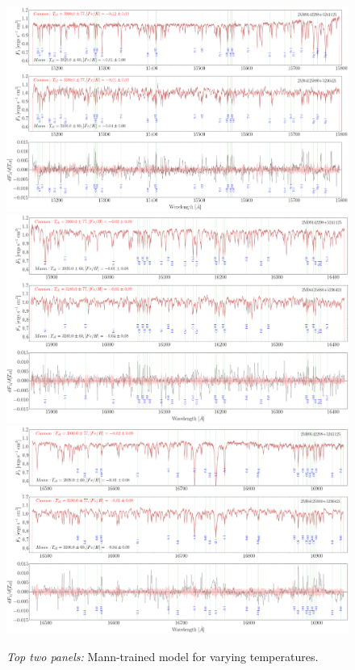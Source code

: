 \documentclass[modern]{aastex62}
\begin{document}
\begin{figure}[ht]
\begin{center}
\includegraphics[width=16cm]{figures/demo_derivatives_teff1.png}
\includegraphics[width=16cm]{figures/demo_derivatives_teff2.png}
\includegraphics[width=16cm]{figures/demo_derivatives_teff3.png}
\end{center}
\caption{\textit{Top two panels:} Mann-trained model for varying temperatures.} \label{fig:demo_teff}
\end{figure}
\end{document}
